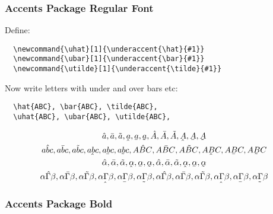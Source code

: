 \documentclass[12pt,english]{article}
\begin{document}
\subsubsection{Accents Package Regular Font}

Define:

\newcommand{\uhat}[1]{\underaccent{\hat}{#1}}
\newcommand{\ubar}[1]{\underaccent{\bar}{#1}}
\newcommand{\utilde}[1]{\underaccent{\tilde}{#1}}
\begin{verbatim}
  \newcommand{\uhat}[1]{\underaccent{\hat}{#1}}
  \newcommand{\ubar}[1]{\underaccent{\bar}{#1}}
  \newcommand{\utilde}[1]{\underaccent{\tilde}{#1}}
\end{verbatim}

Now write letters with under and over bars etc:

\begin{verbatim}
  \hat{ABC}, \bar{ABC}, \tilde{ABC},
  \uhat{ABC}, \ubar{ABC}, \utilde{ABC},
\end{verbatim}
\begin{align}
    \begin{gathered}
      \hat{a}, \bar{a}, \tilde{a}, \uhat{a}, \ubar{a}, \utilde{a},
      \hat{A}, \bar{A}, \tilde{A}, \uhat{A}, \ubar{A}, \utilde{A}
      \\
      \hat{abc}, \bar{abc}, \tilde{abc}, \uhat{abc}, \ubar{abc}, \utilde{abc},
      \hat{ABC}, \bar{ABC}, \tilde{ABC}, \uhat{ABC}, \ubar{ABC}, \utilde{ABC}
      \\
      \hat{\alpha}, \bar{\alpha}, \tilde{\alpha}, \uhat{\alpha}, \ubar{\alpha}, \utilde{\alpha},
      \hat{\alpha}, \bar{\alpha}, \tilde{\alpha}, \uhat{\alpha}, \ubar{\alpha}, \utilde{\alpha}
      \\
      \hat{\alpha\Gamma\beta}, \bar{\alpha\Gamma\beta}, \tilde{\alpha\Gamma\beta}, \uhat{\alpha\Gamma\beta}, \ubar{\alpha\Gamma\beta}, \utilde{\alpha\Gamma\beta},
      \hat{\alpha\Gamma\beta}, \bar{\alpha\Gamma\beta}, \tilde{\alpha\Gamma\beta}, \uhat{\alpha\Gamma\beta}, \ubar{\alpha\Gamma\beta}, \utilde{\alpha\Gamma\beta}
      \\
    \end{gathered}
\end{align}

\subsubsection{Accents Package Bold}
\end{document}
